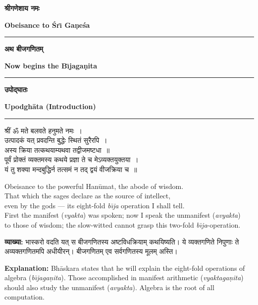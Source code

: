 \documentclass[11pt,a4paper]{article}
\newcommand{\dev}[1]{{\devanagarifont #1}}
\newcommand{\bicol}[2]{%
\noindent%
\begin{minipage}[t]{0.48\textwidth}
\begin{flushleft}
\small
#1
\end{flushleft}
\end{minipage}%
\hfill%
\begin{minipage}[t]{0.48\textwidth}
\begin{flushleft}
\small
#2
\end{flushleft}
\end{minipage}%
\vspace{0.4em}
}
\newcommand{\bicolverse}[2]{%
\par\noindent%
\begin{minipage}[t]{0.48\textwidth}
\centering
\color{versecolor}
\devanagarifont
\small
#1
\end{minipage}%
\hfill%
\begin{minipage}[t]{0.48\textwidth}
\centering
\color{versecolor}
\small
#2
\end{minipage}%
\par\vspace{0.4em}
}
\newcommand{\sectionbicol}[2]{%
\vspace{0.5em}
\noindent%
\begin{minipage}[t]{0.48\textwidth}
\begin{center}
\large\bfseries\color{sectioncolor}
\dev{#1}
\end{center}
\end{minipage}%
\hfill%
\begin{minipage}[t]{0.48\textwidth}
\begin{center}
\large\bfseries\color{sectioncolor}
#2
\end{center}
\end{minipage}%
\vspace{0.3em}
\noindent\rule{\textwidth}{0.4pt}
}
\begin{document}
\thispagestyle{empty}
\vspace*{0.5cm}

\begin{center}
\sectionbicol{श्रीगणेशाय नमः}{Obeisance to \'{S}r\={\i} Ga\d{n}e\'{s}a}
\end{center}

\vspace{0.5cm}

\begin{center}
\sectionbicol{अथ बीजगणितम्}{Now begins the B\={\i}jaga\d{n}ita}
\end{center}

\vspace{0.8cm}

\sectionbicol{उपोद्घातः}{Upodgh\={a}ta (Introduction)}

\vspace{0.3cm}

\bicolverse{%
श्रीं ॐ मते बलवते हनुमते नमः~।\\[0.3cm]
उत्पादकं यत् प्रवदन्ति बुद्धेः स्थितं सुरैरपि~।\\
अस्य क्रिया तत्कथयाम्यथवा तद्वीजमष्टधा~॥\\[0.2cm]
पूर्वं प्रोक्तं व्यक्तमस्य कथये प्रज्ञा ते च मेऽव्यक्तयुक्तया~।\\
यं तु शक्या मन्दबुद्धिर्न तत्समं न तद् द्वयं वीजक्रिया च~॥
}{%
Obeisance to the powerful Han\={u}mat, the abode of wisdom.\\[0.3cm]
That which the sages declare as the source of intellect,\\
even by the gods --- its eight-fold \textit{b\={\i}ja} operation I shall tell.\\[0.2cm]
First the manifest (\textit{vyakta}) was spoken; now I speak the unmanifest (\textit{avyakta})\\
to those of wisdom; the slow-witted cannot grasp this two-fold \textit{b\={\i}ja}-operation.
}

\vspace{0.5cm}

\bicol{%
\textbf{व्याख्या:} भास्करो वदति यत् स बीजगणितस्य अष्टविधक्रियाम् कथयिष्यति। ये व्यक्तगणिते निपुणाः ते अव्यक्तगणितमपि अधीयीरन्। बीजगणितम् एव सर्वगणितस्य मूलम् अस्ति।
}{%
\textbf{Explanation:} Bh\={a}skara states that he will explain the eight-fold operations of algebra (\textit{b\={\i}jaga\d{n}ita}). Those accomplished in manifest arithmetic (\textit{vyaktaga\d{n}ita}) should also study the unmanifest (\textit{avyakta}). Algebra is the root of all computation.
}
\end{document}
